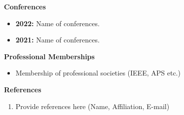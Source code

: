 \documentclass[10.5pt,A4]{article}
\newcommand{\cvsection}[1]
{
	\begin{center}
		\Large\textcolor{sectcol}{\textbf{#1}}
	\end{center}
}
\newcommand{\cvsubsection}[1]
{
\begin{center}
  \large\textcolor{subsectcol}{\textbf{#1}}\\[2pt]
\end{center}
}
\begin{document}
\cvsubsection{Conferences}
\begin{itemize}
\itemsep0em
    \item \textbf{2022:} Name of conferences.
    \item \textbf{2021:} Name of conferences.
\end{itemize}
\cvsection{Professional Memberships}
\begin{itemize}
\itemsep0em
    \item Membership of professional societies (IEEE, APS etc.)
\end{itemize}
\cvsection{References}
\begin{enumerate}
    \item Provide references here (Name, Affiliation, E-mail)   
\end{enumerate}
\end{document}
